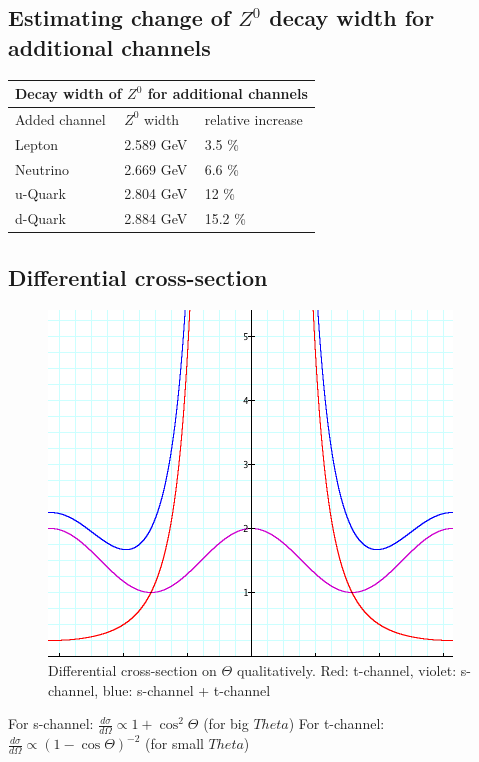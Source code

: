\documentclass[]{article}
\begin{document}
\subsection{Estimating change of $Z^0$ decay width for additional channels}

\begin{tabular}{ |p{3cm}||p{3cm}|p{3cm}|  }
 \hline
 \multicolumn{3}{|c|}{Decay width of $Z^0$ for additional channels} \\
 \hline
 Added channel & $Z^0$ width & relative increase \\
 \hline
   Lepton & 2.589 GeV & 3.5 \%  \\
   Neutrino & 2.669  GeV & 6.6 \%  \\
   u-Quark & 2.804  GeV & 12 \%  \\
   d-Quark & 2.884 GeV & 15.2 \%  \\
  \hline
\end{tabular}

\subsection{Differential cross-section}
\begin{figure}[H]
	\centering
	\includegraphics[scale=0.4]{differential-cross-section}
	\caption{Differential cross-section on $\Theta$ qualitatively. Red: t-channel, violet: s-channel, blue: s-channel + t-channel}
	\label{fig:diff-cross-section}
\end{figure}
For s-channel: $\frac{d\sigma}{d\Omega} \propto 1 + \cos^2{\Theta}$ (for big $Theta$)
\newline
For t-channel: $\frac{d\sigma}{d\Omega} \propto (1 - \cos{\Theta})^{-2}$ (for small $Theta$)
\end{document}
